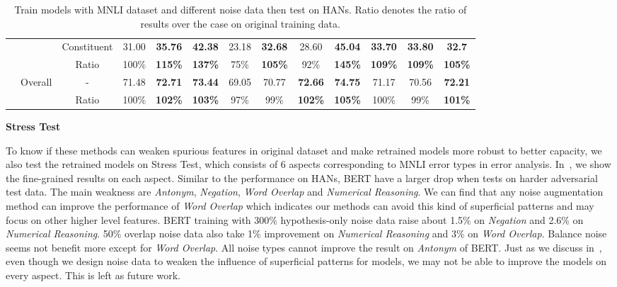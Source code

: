 \begin{table}[]
\begin{tabular}{|c|c|c|c|c|c|c|c|c|c|c|c|c|}
                          &                               & Constituent     & 31.00                     & \bf 35.76                          & \bf 42.38   & 23.18   & \bf 32.68   & 28.60   & \bf 45.04   & \bf 33.70  & \bf 33.80  & \bf 32.7   \\ \cline{3-13} 
                          &                               & Ratio           & 100\%                     & \bf 115\%                          & \bf 137\%   & 75\%    & \bf 105\%   & 92\%    & \bf 145\%   & \bf 109\%  & \bf 109\%  & \bf 105\%  \\ \cline{2-13} 
                          & \multirow{2}{*}{Overall}      & -               & 71.48                     & \bf 72.71                          & \bf 73.44   & 69.05   & 70.77   & \bf 72.66   & \bf 74.75   & 71.17  & 70.56  & \bf 72.21  \\ \cline{3-13} 
                          &                               & Ratio           & 100\%                     & \bf 102\%                          & \bf 103\%   & 97\%    & 99\%    & \bf 102\%   & \bf 105\%   & 100\%  & 99\%   & \bf 101\%  \\ \hline
\end{tabular}
\caption{Train models with MNLI dataset and different noise data then test on HANs. 
Ratio denotes the ratio of results over the case on original training data.}
	\label{tab:HANS}
\end{table}


\noindent\textbf{Stress Test} 

To know
if these methods can weaken spurious features in original dataset 
and make retrained models
more robust to better capacity, we also test the retrained models on Stress Test, 
which consists of 6 aspects corresponding to MNLI error 
types in error analysis. In~, we show the fine-grained results 
on each aspect. Similar to the performance on HANs, BERT have a larger drop when 
tests on harder adversarial test data. The main weakness are \textit{Antonym}, 
\textit{Negation}, \textit{ Word Overlap} and \textit{Numerical Reasoning}. 
We can find that any noise augmentation method can improve the performance of 
\textit{ Word Overlap} which indicates our methods can avoid this kind of superficial
patterns and may focus on other higher level features. BERT training with 
300\% hypothesis-only noise data raise about 1.5\% on \textit{Negation} and 2.6\% 
on \textit{Numerical Reasoning}. 50\% overlap noise data also take 1\% improvement 
on  \textit{Numerical Reasoning} and 3\% on \textit{ Word Overlap}. Balance noise 
seems not benefit more except for \textit{ Word Overlap}. All noise types cannot 
improve the result on \textit{Antonym} of BERT.
Just as we discuss in~, even though we design noise data 
to weaken the influence of superficial patterns for models, we may not be able 
to improve the models on every aspect. This is left as future work.

